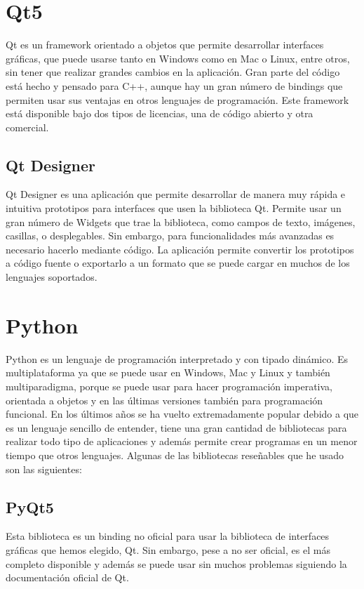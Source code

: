 \section{Qt5}
Qt es un framework orientado a objetos que permite desarrollar interfaces gráficas, que puede usarse tanto en Windows como en Mac o Linux, entre otros, sin tener que realizar grandes cambios en la aplicación. Gran parte del código está hecho y pensado para C++, aunque hay un gran número de bindings que permiten usar sus ventajas en otros lenguajes de programación. Este framework está disponible bajo dos tipos de licencias, una de código abierto y otra comercial.
\subsection{Qt Designer}
Qt Designer es una aplicación que permite desarrollar de manera muy rápida e intuitiva prototipos para interfaces que usen la biblioteca Qt. Permite usar un gran número de Widgets que trae la biblioteca, como campos de texto, imágenes, casillas, o desplegables. Sin embargo, para funcionalidades más avanzadas es necesario hacerlo mediante código. La aplicación permite convertir los prototipos a código fuente o exportarlo a un formato que se puede cargar en muchos de los lenguajes soportados.

\section{Python}
Python es un lenguaje de programación interpretado y con tipado dinámico. Es multiplataforma ya que se puede usar en Windows, Mac y Linux y también multiparadigma, porque se puede usar para hacer programación imperativa, orientada a objetos y en las últimas versiones también para programación funcional.
En los últimos años se ha vuelto extremadamente popular debido a que es un lenguaje sencillo de entender, tiene una gran cantidad de bibliotecas para realizar todo tipo de aplicaciones y además permite crear programas en un menor tiempo que otros lenguajes.
Algunas de las bibliotecas reseñables que he usado son las siguientes:
\subsection{PyQt5}
Esta biblioteca es un binding no oficial para usar la biblioteca de interfaces gráficas que hemos elegido, Qt. Sin embargo, pese a no ser oficial, es el más completo disponible y además se puede usar sin muchos problemas siguiendo la documentación oficial de Qt.
